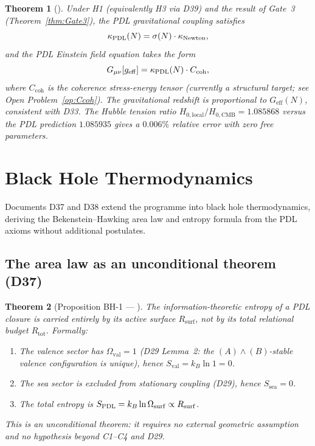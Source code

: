 \documentclass[11pt,a4paper]{article}
\theoremstyle{plain}
\newtheorem{theorem}{Theorem}[section]
\theoremstyle{definition}
\theoremstyle{remark}
\newcommand{\PDL}{\textnormal{PDL}}
\newcommand{\Geff}{G_{\mathrm{eff}}}
\newcommand{\Rsurf}{R_{\mathrm{surf}}}
\newcommand{\Rtot}{R_{\mathrm{tot}}}
\begin{document}
\begin{theorem}[\citep{D35}]
\label{thm:Einstein}
Under H1 (equivalently H3 via D39) and the result of Gate~3 (Theorem~\ref{thm:Gate3}), the PDL gravitational coupling satisfies
\[
\kappa_{\PDL}(N) = \sigma(N)\cdot\kappa_{\mathrm{Newton}},
\]
and the PDL Einstein field equation takes the form
\[
G_{\mu\nu}[g_{\mathrm{eff}}] = \kappa_{\PDL}(N)\cdot C_{\mathrm{coh}},
\]
where $C_{\mathrm{coh}}$ is the coherence stress-energy tensor (currently a structural target; see Open Problem~\ref{op:Ccoh}).
The gravitational redshift is proportional to $\Geff(N)$, consistent with D33.
The Hubble tension ratio $H_{0,\mathrm{local}}/H_{0,\mathrm{CMB}}=1.085868$ versus the PDL prediction $1.085935$ gives a $0.006\%$ relative error with zero free parameters.
\end{theorem}

\section{Black Hole Thermodynamics}
\label{sec:bh}

Documents D37 and D38 extend the programme into black hole thermodynamics, deriving the Bekenstein--Hawking area law and entropy formula from the PDL axioms without additional postulates.

\subsection{The area law as an unconditional theorem (D37)}
\label{subsec:bh_area}

\begin{theorem}[Proposition BH-1 — \citep{D37}]
\label{thm:BH1}
The information-theoretic entropy of a PDL closure is carried entirely by its active surface $\Rsurf$, not by its total relational budget $\Rtot$.
Formally:
\begin{enumerate}
\item The valence sector has $\Omega_{\mathrm{val}} = 1$ (D29 Lemma~2: the $(A)\wedge(B)$-stable valence configuration is unique), hence $S_{\mathrm{val}} = k_B \ln 1 = 0$.
\item The sea sector is excluded from stationary coupling (D29), hence $S_{\mathrm{sea}} = 0$.
\item The total entropy is $S_{\PDL} = k_B \ln \Omega_{\mathrm{surf}} \propto \Rsurf$.
\end{enumerate}
This is an \emph{unconditional theorem}: it requires no external geometric assumption and no hypothesis beyond C1--C4 and D29.
\end{theorem}
\end{document}
